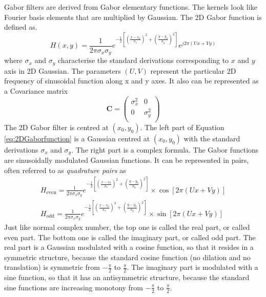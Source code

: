 Gabor filters are derived from Gabor elementary functions. The kernels look like Fourier basis elements that are multiplied by Gaussian. The 2D Gabor function is defined as.
\begin{equation}\label{eq:2DGaborfunction}
 H(x,y) = \frac{1}{2\pi\sigma_x\sigma_y}e^{-\frac{1}{2}[(\frac{x-x_0}{\sigma_x})^2+(\frac{y-y_0}{\sigma_y})^2]}e^{j2\pi(Ux+Vy)}
\end{equation}
where $\sigma_x$ and $\sigma_y$ characterise the standard derivations corresponding to $x$ and $y$ axis in 2D Gaussian. The parameters $(U, V)$ represent the particular 2D frequency of sinusoidal function along x and y axes. It also can be represented as a Covariance matrix
\begin{displaymath}
 \mathbf{C} = \left( \begin{array}{cc}
             \sigma_x^2 & 0 \\
	     0 & \sigma_y^2 \\
            \end{array} \right)
\end{displaymath}
The 2D Gabor filter is centred at $(x_0,y_0)$. The left part of \mbox{Equation} \ref{eq:2DGaborfunction} is a Gaussian centred at $(x_0, y_0)$ with the standard derivations $\sigma_x$ and $\sigma_y$. The right part is a complex formula. The Gabor functions are sinusoidally modulated Gaussian functions. It can be represented in pairs, often referred to as \textit{quadrature pairs} as 
\begin{displaymath}
\begin{array}{l}
 H_{\mathrm{even}} = \frac{1}{2\pi\sigma_x\sigma_y}e^{-\frac{1}{2}[(\frac{x-x_0}{\sigma_x})^2+(\frac{y-y_0}{\sigma_y})^2]} \times \cos{[2\pi(Ux+Vy)]} \\
 H_{\mathrm{odd}} = \frac{1}{2\pi\sigma_x\sigma_y}e^{-\frac{1}{2}[(\frac{x-x_0}{\sigma_x})^2+(\frac{y-y_0}{\sigma_y})^2]} \times \sin{[2\pi(Ux+Vy)]} 
\end{array}
\end{displaymath}
Just like normal complex number, the top one is called the real part, or called even part. The bottom one is called the imaginary part, or called odd part. The real part is a Gaussian modulated with a cosine function, so that it resides in a symmetric structure, because the standard cosine function (no dilation and no translation) is symmetric from $-\frac{\pi}{2}$ to $\frac{\pi}{2}$. The imaginary part is modulated with a sine function, so that it has an antisymmetric structure, because the standard sine functions are increasing monotony from $-\frac{\pi}{2}$ to $\frac{\pi}{2}$.

